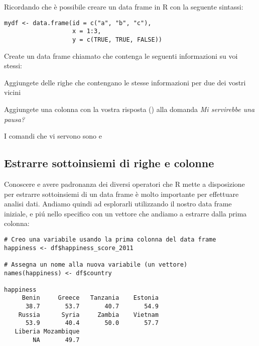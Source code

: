 \vspace{0.5cm} 

\begin{exercise}\label{ex3.3}

\noindent Ricordando che \`e possibile creare un data frame in R con la seguente sintassi:


\begin{lstlisting}[style=Rstyle]
mydf <- data.frame(id = c("a", "b", "c"),
                   x = 1:3,
                   y = c(TRUE, TRUE, FALSE))
\end{lstlisting}

\begin{myenumerate}
	\item Create un data frame chiamato  che contenga le seguenti informazioni su voi stessi: 
	\item Aggiungete delle righe che contengano le stesse informazioni per due dei vostri vicini
	\item Aggiungete una colonna con la vostra risposta () alla domanda \emph{Mi servirebbe una pausa?}
\end{myenumerate}

	\begin{myitemize}
		\item I comandi che vi servono sono  e 
	\end{myitemize}

\end{exercise}


\subsection{Estrarre sottoinsiemi di righe e colonne}
\label{sec:subsetting}

Conoscere e avere padronanza dei diversi operatori che R mette a disposizione per estrarre sottoinsiemi di un data frame \`e molto importante per effettuare analisi dati. Andiamo quindi ad esplorarli utilizzando il nostro data frame iniziale,  e pi\'u nello specifico con un vettore che andiamo a estrarre dalla prima colonna:

\begin{lstlisting}[style=Rstyle]
# Creo una variabile usando la prima colonna del data frame
happiness <- df$happiness_score_2011

# Assegna un nome alla nuova variabile (un vettore)
names(happiness) <- df$country  

happiness
     Benin     Greece   Tanzania    Estonia 
      38.7       53.7       40.7       54.9 
    Russia      Syria     Zambia    Vietnam 
      53.9       40.4       50.0       57.7 
   Liberia Mozambique 
        NA       49.7 
\end{lstlisting}


